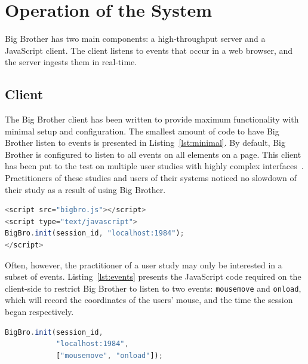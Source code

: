 \section{Operation of the System}


Big Brother has two main components: a high-throughput server and a JavaScript client. The client listens to events that occur in a web browser, and the server ingests them in real-time.
\vspace{-8pt}
\subsection{Client}

The Big Brother client has been written to provide maximum functionality with minimal setup and configuration. The smallest amount of code to have Big Brother listen to events is presented in Listing~\ref{lst:minimal}. By default, Big Brother is configured to listen to all events on all elements on a page. This client has been put to the test on multiple user studies with highly complex interfaces~\cite{cross2021search,jimmy2019health,jimmy2020health}. Practitioners of these studies and users of their systems noticed no slowdown of their study as a result of using Big Brother.

\begin{lstlisting}[language=JavaScript, label=lst:minimal, caption=Minimal example of code required to initialise \bb on the client-side. Note the \texttt{session\_id} which should already be initialied elsewhere.]
<script src="bigbro.js"></script>
<script type="text/javascript">
BigBro.init(session_id, "localhost:1984");
</script>
\end{lstlisting}

\noindent
Often, however, the practitioner of a user study may only be interested in a subset of events. Listing~\ref{lst:events} presents the JavaScript code required on the client-side to restrict Big Brother to listen to two events: \texttt{mousemove} and \texttt{onload}, which will record the coordinates of the users' mouse, and the time the session began respectively.

\begin{lstlisting}[language=JavaScript, label=lst:events, caption=Initialising \bb to listen on only certain global events. HTML code removed for brevity.]
BigBro.init(session_id, 
            "localhost:1984", 
            ["mousemove", "onload"]);
\end{lstlisting}

